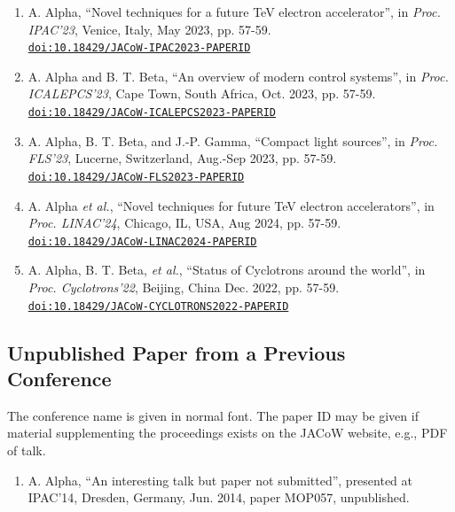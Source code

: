 \documentclass[%
               hyphens,       %
               ]{jacow}
\begin{document}
\begin{enumerate}\small
	\item A. Alpha, “Novel techniques for a future TeV electron accelerator”, 
		in \textit{Proc. IPAC’23}, Venice, Italy, May 2023, pp. 57-59. \\ \href{https://doi.org/10.18429/JACoW-IPAC2023}%
		     {\texttt{{doi:10.18429/JACoW-IPAC2023-PAPERID}}}

	\item A. Alpha and B. T. Beta, “An overview of modern control systems”, 
		in \textit{Proc. ICALEPCS’23}, Cape Town, South Africa, Oct. 2023, pp. 57-59. \\ \href{https://doi.org/10.18429/JACoW-ICALEPCS2023}%
		     {\texttt{doi:10.18429/JACoW-ICALEPCS2023-PAPERID}}

	\item A. Alpha, B. T. Beta, and J.-P. Gamma, “Compact light sources”, 
		in \textit{ Proc. FLS’23}, Lucerne, Switzerland, Aug.-Sep 2023, pp. 57-59. \\ \href{https://doi.org/10.18429/JACoW-FLS2023}%
		     {\texttt{doi:10.18429/JACoW-FLS2023-PAPERID}}

	\item A. Alpha \textit{et al.}, “Novel techniques for future TeV electron accelerators”, 
		in \textit{Proc. LINAC’24}, Chicago, IL, USA, Aug 2024, pp. 57-59. \\
		\href{https://doi.org/10.18429/JACoW-LINAC2024}%
		    {\texttt{doi:10.18429/JACoW-LINAC2024-PAPERID}}

	\item A. Alpha, B. T. Beta, \textit{et al.}, “Status of Cyclotrons around the world”, 
		in \textit{Proc. Cyclotrons’22}, Beijing, China Dec. 2022, pp. 57-59. \\
		\href{https://doi.org/10.18429/JACoW-CYCLOTRONS2022}%
		     {\texttt{doi:10.18429/JACoW-CYCLOTRONS2022-PAPERID}}
\end{enumerate}

\subsection{Unpublished Paper from a Previous Conference}

The conference name is given in normal font. The paper ID may be given if material supplementing the proceedings exists on the JACoW website, e.g., PDF of talk.
\begin{enumerate}[resume*]\small
	\item A. Alpha, “An interesting talk but paper not submitted”, presented at IPAC’14, Dresden, Germany, Jun. 2014, paper MOP057, unpublished. 
\end{enumerate}
\end{document}
